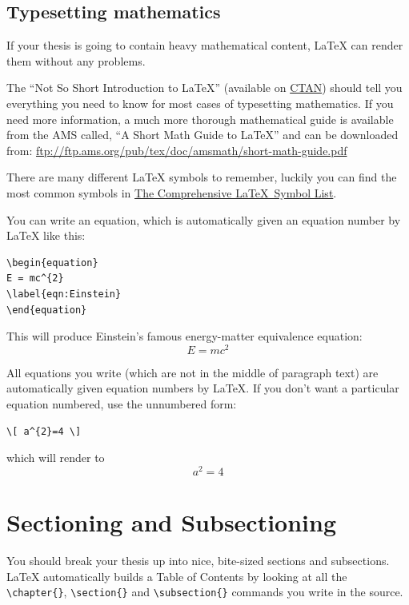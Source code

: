 \subsection{Typesetting mathematics}

If your thesis is going to contain heavy mathematical content, \LaTeX{} can render them without any problems.

The \enquote{Not So Short Introduction to \LaTeX} (available on \href{http://www.ctan.org/tex-archive/info/lshort/english/lshort.pdf}{CTAN}) should tell you everything you need to know for most cases of typesetting mathematics. If you need more information, a much more thorough mathematical guide is available from the AMS called, \enquote{A Short Math Guide to \LaTeX} and can be downloaded from:
\url{ftp://ftp.ams.org/pub/tex/doc/amsmath/short-math-guide.pdf}

There are many different \LaTeX{} symbols to remember, luckily you can find the most common symbols in \href{http://ctan.org/pkg/comprehensive}{The Comprehensive \LaTeX~Symbol List}.

You can write an equation, which is automatically given an equation number by \LaTeX{} like this:
\begin{verbatim}
\begin{equation}
E = mc^{2}
\label{eqn:Einstein}
\end{equation}
\end{verbatim}

This will produce Einstein's famous energy-matter equivalence equation:
\begin{equation}
E = mc^{2}
\label{eqn:Einstein}
\end{equation}

All equations you write (which are not in the middle of paragraph text) are automatically given equation numbers by \LaTeX{}. If you don't want a particular equation numbered, use the unnumbered form:
\begin{verbatim}
\[ a^{2}=4 \]
\end{verbatim}
which will render to
\[ a^{2} = 4 \]


\section{Sectioning and Subsectioning}

You should break your thesis up into nice, bite-sized sections and subsections.
\LaTeX{} automatically builds a Table of Contents by looking at all the \verb|\chapter{}|, \verb|\section{}|  and \verb|\subsection{}| commands you write in the source.

